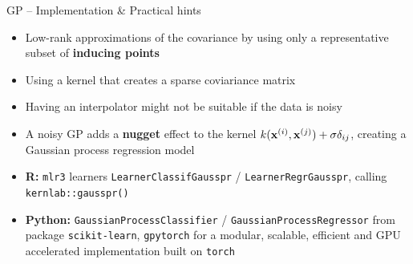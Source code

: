 \begin{frame}{GP -- Implementation \& Practical hints}

\begin{itemize}
	\item Low-rank approximations of the covariance by using only a representative subset of \textbf{inducing points}
	\item Using a kernel that creates a sparse coviariance matrix
\end{itemize}

\medskip

\begin{itemize}
    \item Having an interpolator might not be suitable if the data is noisy
    \item A noisy GP adds a \textbf{nugget} effect to the kernel $k(\mathbf{x}^{(i)}, \mathbf{x}^{(j)}) + \sigma\delta_{ij}$, creating a Gaussian process regression model
\end{itemize}

\medskip


\begin{itemize}
  \item \textbf{R:} \texttt{mlr3} learners \texttt{LearnerClassifGausspr} /
    \texttt{LearnerRegrGausspr}, calling \texttt{kernlab::gausspr()}
  \item \textbf{Python:} \texttt{GaussianProcessClassifier} /
  \texttt{GaussianProcessRegressor} from package \texttt{scikit-learn}, \texttt{gpytorch} for a modular, scalable, efficient and GPU accelerated implementation built on \texttt{torch}
\end{itemize}

\end{frame}

